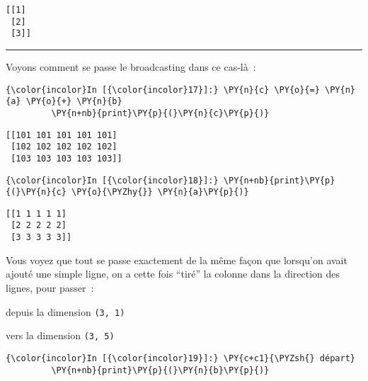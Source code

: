     \begin{Verbatim}[commandchars=\\\{\}]
[[1]
 [2]
 [3]]

    \end{Verbatim}

    \begin{center}\rule{0.5\linewidth}{\linethickness}\end{center}

    Voyons comment se passe le broadcasting dans ce cas-là~:

    \begin{Verbatim}[commandchars=\\\{\}]
{\color{incolor}In [{\color{incolor}17}]:} \PY{n}{c} \PY{o}{=} \PY{n}{a} \PY{o}{+} \PY{n}{b}
         \PY{n+nb}{print}\PY{p}{(}\PY{n}{c}\PY{p}{)}
\end{Verbatim}


    \begin{Verbatim}[commandchars=\\\{\}]
[[101 101 101 101 101]
 [102 102 102 102 102]
 [103 103 103 103 103]]

    \end{Verbatim}

    \begin{Verbatim}[commandchars=\\\{\}]
{\color{incolor}In [{\color{incolor}18}]:} \PY{n+nb}{print}\PY{p}{(}\PY{n}{c} \PY{o}{\PYZhy{}} \PY{n}{a}\PY{p}{)}
\end{Verbatim}


    \begin{Verbatim}[commandchars=\\\{\}]
[[1 1 1 1 1]
 [2 2 2 2 2]
 [3 3 3 3 3]]

    \end{Verbatim}

    Vous voyez que tout se passe exactement de la même façon que lorsqu'on
avait ajouté une simple ligne, on a cette fois ``tiré'' la colonne dans
la direction des lignes, pour passer~:

    depuis la dimension \texttt{(3,\ 1)}

    vers la dimension \texttt{(3,\ 5)}

    \begin{Verbatim}[commandchars=\\\{\}]
{\color{incolor}In [{\color{incolor}19}]:} \PY{c+c1}{\PYZsh{} départ}
         \PY{n+nb}{print}\PY{p}{(}\PY{n}{b}\PY{p}{)}
\end{Verbatim}


